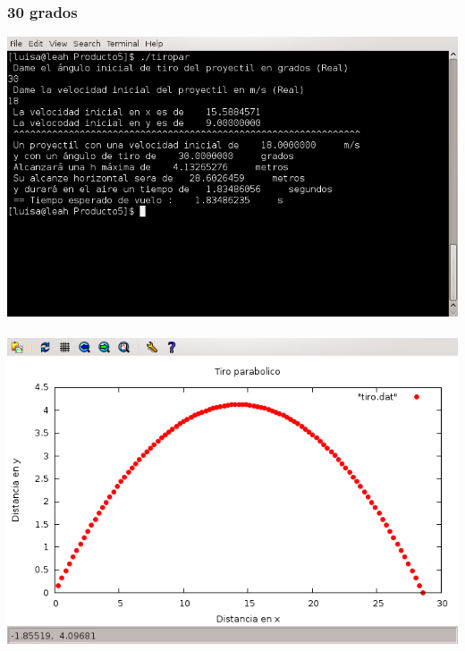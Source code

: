 \documentclass[10pt]{article}
\begin{document}
\subsubsection{30 grados}
\includegraphics[scale=0.6]{screen30.png} \\
\\
\includegraphics[scale=0.6]{grafica30.png}

\newpage
\end{document}
